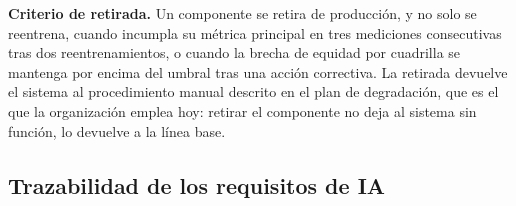 \noindent
\textbf{Criterio de retirada.} Un componente se retira de producción, y no solo se reentrena, cuando
incumpla su métrica principal en tres mediciones consecutivas tras dos reentrenamientos, o cuando la
brecha de equidad por cuadrilla se mantenga por encima del umbral tras una acción correctiva. La
retirada devuelve el sistema al procedimiento manual descrito en el plan de degradación, que es el
que la organización emplea hoy: retirar el componente no deja al sistema sin función, lo devuelve a
la línea base.

\subsection{Trazabilidad de los requisitos de IA}
\label{sec:traza-ia-informe}

